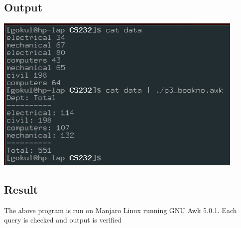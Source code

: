 \documentclass{article}
\begin{document}
\subsection{Output}
\includegraphics[width=0.9\textwidth]{img/p18/ss.png}\newline

\subsection{Result}
The above program is run on Manjaro Linux running GNU Awk 5.0.1. 
Each query is checked and output is verified
\end{document}
